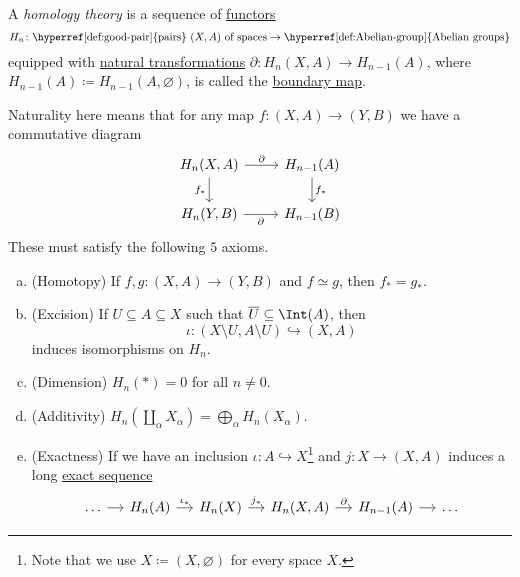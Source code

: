 \begin{definition}\label{def:homology-theory}
	A \emph{homology theory} is a sequence of \hyperref[def:functor]{functors}
	\[
		H_n \colon \text{\hyperref[def:good-pair]{pairs} \((X, A)\) of spaces} \to \text{\hyperref[def:Abelian-group]{Abelian groups}}
	\]
	equipped with \hyperref[def:natural-transformation]{natural transformations} \(\partial \colon H_n(X, A) \to H_{n - 1}(A)\), where \(H_{n - 1}(A) \coloneqq H_{n - 1}(A, \varnothing)\), is called the \underline{boundary map}.

	Naturality here means that for any map \(f \colon (X, A) \to (Y, B)\) we have a commutative diagram
	\[
		\begin{tikzcd}
			{H_{n}(X, A)} & {H_{n-1}(A)} \\
			{H_n(Y, B)} & {H_{n-1}(B)}
			\arrow["{\partial }", from=1-1, to=1-2]
			\arrow["{f_\ast}", from=1-2, to=2-2]
			\arrow["{\partial }"', from=2-1, to=2-2]
			\arrow["{f_\ast}"', from=1-1, to=2-1]
		\end{tikzcd}
	\]
	These must satisfy the following \(5\) axioms.
	\begin{enumerate}[(a)]
		\item (Homotopy) If \(f, g \colon (X, A) \to (Y, B)\) and \(f \simeq g\), then \(f_\ast = g_\ast\).
		\item (Excision) If \(U \subseteq A \subseteq X\) such that \(\overline{U} \subseteq \Int  (A)\), then
		      \[
			      \iota \colon (X \setminus U, A \setminus U) \hookrightarrow (X, A)
		      \]
		      induces isomorphisms on \(H_n\).
		\item (Dimension) \(H_n(\ast) = 0\) for all \(n \neq 0\).
		\item (Additivity) \(H_n\left(\coprod_\alpha X_\alpha\right) = \bigoplus_\alpha H_n(X_\alpha)\).
		\item (Exactness) If we have an inclusion \(\iota \colon A \hookrightarrow X\)\footnote{Note that we use \(X\coloneqq (X, \varnothing )\) for every space \(X\).} and \(j \colon X \to (X, A)\) induces a long \hyperref[def:exact-sequence]{exact sequence}
		      \[
			      \begin{tikzcd}[column sep=small]
				      \dots & {H_n(A)} & {H_n(X)} & {H_{n}(X, A)} & {H_{n-1}(A)} & \dots
				      \arrow[from=1-1, to=1-2]
				      \arrow["{\iota_\ast}", from=1-2, to=1-3]
				      \arrow["{j_\ast}", from=1-3, to=1-4]
				      \arrow["\partial", from=1-4, to=1-5]
				      \arrow[from=1-5, to=1-6]
			      \end{tikzcd}
		      \]
	\end{enumerate}
\end{definition}

